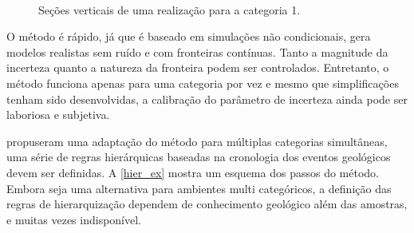 \begin{figure}[H]
\caption{Seções verticais de uma realização para a categoria 1.} 
\label{cpar_real}
\begin{center}
\\
\end{center}
\begin{center}
\end{center}
\end{figure}

O método é rápido, já que é baseado em simulações não condicionais, gera modelos realistas sem ruído e com fronteiras contínuas. Tanto a magnitude da incerteza quanto a natureza da fronteira podem ser controlados. Entretanto, o método funciona apenas para uma categoria por vez e mesmo que simplificações tenham sido desenvolvidas, a calibração do parâmetro de incerteza ainda pode ser laboriosa e subjetiva.

 propuseram uma adaptação  do método para múltiplas categorias simultâneas, uma série de regras hierárquicas baseadas na cronologia dos eventos geológicos devem ser definidas. A \autoref{hier_ex} mostra um esquema dos passos do método. Embora seja uma alternativa para ambientes multi categóricos, a definição das regras de hierarquização dependem de conhecimento geológico além das amostras, e muitas vezes indisponível.

